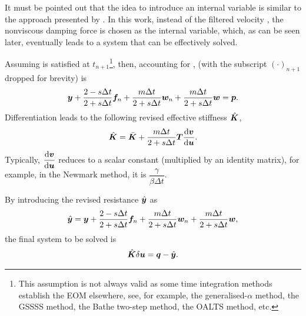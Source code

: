 It must be pointed out that the idea to introduce an internal variable is similar to the approach presented by \citet[][see \S~4.3]{Adhikari2014}. In this work, instead of the filtered velocity \citep[][see Eq. 4.23]{Adhikari2014}, the nonviscous damping force is chosen as the internal variable, which, as can be seen later, eventually leads to a system that can be effectively solved.

Assuming  is satisfied at $t_{n+1}$\footnote{This assumption is not always valid as some time integration methods establish the EOM elsewhere, see, for example, the generalised-$\alpha$ method, the GSSSS method, the Bathe two-step method, the OALTS method, etc.}, then, accounting for ,  (with the subscript $\left(\cdot\right)_{n+1}$ dropped for brevity) is
\begin{gather}\label{eq:residual}
\bm{y}+\dfrac{2-s\Delta{}t}{2+s\Delta{}t}\bm{f}_n+\dfrac{m\Delta{}t}{2+s\Delta{}t}\bm{w}_n+\dfrac{m\Delta{}t}{2+s\Delta{}t}\bm{w}=\bm{p}.
\end{gather}
Differentiation leads to the following revised effective stiffness $\hat{\bm{K}}$,
\begin{gather}\label{eq:revised_k}
\hat{\bm{K}}=\bar{\bm{K}}+\dfrac{m\Delta{}t}{2+s\Delta{}t}\bm{T}\dfrac{\mathrm{d}\bm{v}}{\mathrm{d}\bm{u}}.
\end{gather}
Typically, $\dfrac{\mathrm{d}\bm{v}}{\mathrm{d}\bm{u}}$ reduces to a scalar constant (multiplied by an identity matrix), for example, in the Newmark method, it is $\dfrac{\gamma}{\beta\Delta{}t}$.

By introducing the revised resistance $\hat{\bm{y}}$ as
\begin{gather}\label{eq:revised_y}
\hat{\bm{y}}=\bm{y}+\dfrac{2-s\Delta{}t}{2+s\Delta{}t}\bm{f}_n+\dfrac{m\Delta{}t}{2+s\Delta{}t}\bm{w}_n+\dfrac{m\Delta{}t}{2+s\Delta{}t}\bm{w},
\end{gather}
the final system to be solved is
\begin{gather}\label{eq:revised_system}
\hat{\bm{K}}\delta\bm{u}=\bm{q}-\hat{\bm{y}}.
\end{gather}

